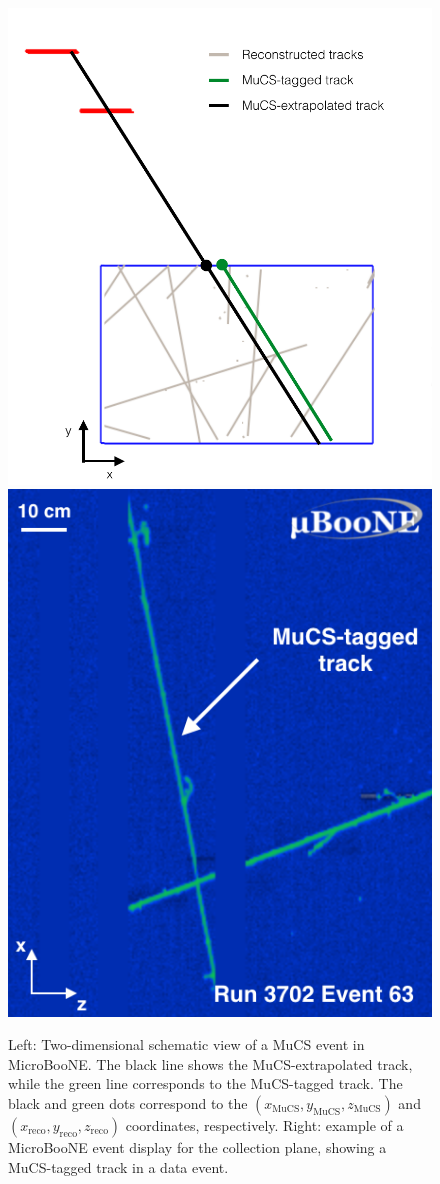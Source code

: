 \documentclass[a4paper,11pt]{article}
\begin{document}
\begin{figure}[htbp]
  \begin{center}
  \includegraphics[width=0.50\linewidth]{figures/evd.pdf}
  \includegraphics[width=0.40\linewidth]{figures/evd_display.png}

  \caption{Left: Two-dimensional schematic view of a MuCS event in MicroBooNE. The black line shows the MuCS-extrapolated track, while the green line corresponds to the MuCS-tagged track. The black and green dots correspond to the $(x_{\mathrm{MuCS}},y_{\mathrm{MuCS}},z_{\mathrm{MuCS}})$ and $(x_{\mathrm{reco}},y_{\mathrm{reco}},z_{\mathrm{reco}})$ coordinates, respectively. Right: example of a MicroBooNE event display for the collection plane, showing a MuCS-tagged track in a data event.} \label{fig:evd}
\end{center}
\end{figure}
\end{document}
